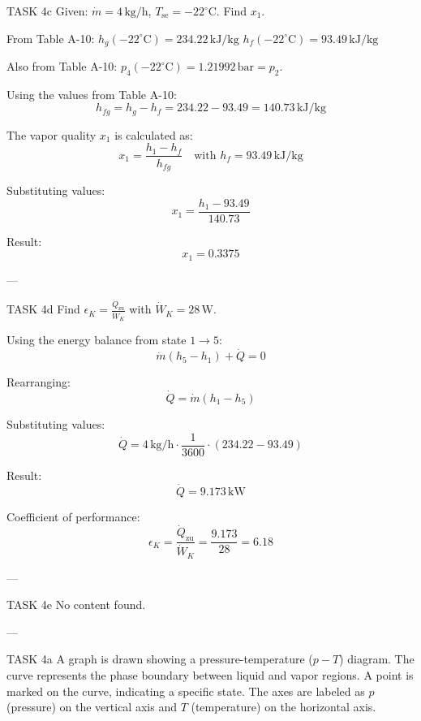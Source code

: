 TASK 4c  
Given: \( \dot{m} = 4 \, \text{kg/h} \), \( T_{\text{se}} = -22^\circ\text{C} \).  
Find \( x_1 \).  

From Table A-10:  
\( h_g(-22^\circ\text{C}) = 234.22 \, \text{kJ/kg} \)  
\( h_f(-22^\circ\text{C}) = 93.49 \, \text{kJ/kg} \)  

Also from Table A-10:  
\( p_4(-22^\circ\text{C}) = 1.21992 \, \text{bar} = p_2 \).  

Using the values from Table A-10:  
\[
h_{fg} = h_g - h_f = 234.22 - 93.49 = 140.73 \, \text{kJ/kg}
\]  

The vapor quality \( x_1 \) is calculated as:  
\[
x_1 = \frac{h_1 - h_f}{h_{fg}} \quad \text{with } h_f = 93.49 \, \text{kJ/kg}
\]  

Substituting values:  
\[
x_1 = \frac{h_1 - 93.49}{140.73}
\]  

Result:  
\[
x_1 = 0.3375
\]  

---

TASK 4d  
Find \( \epsilon_K = \frac{\dot{Q}_{\text{zu}}}{\dot{W}_K} \) with \( \dot{W}_K = 28 \, \text{W} \).  

Using the energy balance from state \( 1 \to 5 \):  
\[
\dot{m} (h_5 - h_1) + \dot{Q} = 0
\]  

Rearranging:  
\[
\dot{Q} = \dot{m} (h_1 - h_5)
\]  

Substituting values:  
\[
\dot{Q} = 4 \, \text{kg/h} \cdot \frac{1}{3600} \cdot (234.22 - 93.49)
\]  

Result:  
\[
\dot{Q} = 9.173 \, \text{kW}
\]  

Coefficient of performance:  
\[
\epsilon_K = \frac{\dot{Q}_{\text{zu}}}{\dot{W}_K} = \frac{9.173}{28} = 6.18
\]  

---

TASK 4e  
No content found.  

---

TASK 4a  
A graph is drawn showing a pressure-temperature (\( p-T \)) diagram. The curve represents the phase boundary between liquid and vapor regions. A point is marked on the curve, indicating a specific state. The axes are labeled as \( p \) (pressure) on the vertical axis and \( T \) (temperature) on the horizontal axis.